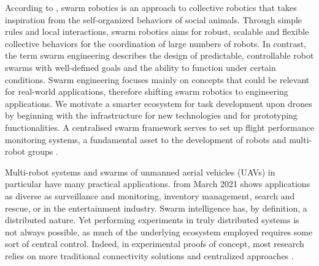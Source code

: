 
According to  \cite{swarm_review}, swarm robotics is an approach to collective robotics that takes inspiration from the self-organized behaviors of social animals. Through simple rules and local interactions, swarm robotics aims for robust, scalable and flexible collective behaviors for the coordination of large numbers of robots. In contrast, the term swarm engineering \cite{swarm_engineering} describes the design of predictable, controllable robot swarms with well-defined goals and the ability to function under certain conditions. Swarm engineering focuses mainly on concepts that could be relevant for real-world applications, therefore shifting swarm robotics to engineering applications. 
We motivate a smarter ecosystem for task development upon drones by beginning with the infrastructure for new technologies and for prototyping functionalities. A centralised swarm framework serves to set up flight performance monitoring systems, a fundamental asset to the development of robots and multi-robot groups \cite{gcs_validation}.

Multi-robot systems and swarms of unmanned aerial vehicles (UAVs) in particular have many practical applications.   \cite{overview_uavsensors} from March 2021 shows applications as diverse as surveillance and monitoring, inventory management, search and rescue, or in the entertainment industry. Swarm intelligence has, by definition, a distributed nature. Yet performing experiments in truly distributed systems is not always possible, as much of the underlying ecosystem employed requires some sort of central control. Indeed, in experimental proofs of concept, most research relies on more traditional connectivity solutions and centralized approaches \cite{gcs_validation}\cite{buzz_swarm_stack}.


